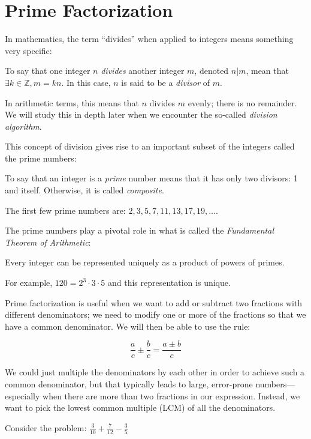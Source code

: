 \documentclass[letterpaper,12pt,fleqn]{article}
\begin{document}
\section*{Prime Factorization}

In mathematics, the term ``divides'' when applied to integers means something
very specific:
\begin{definition}[Divides]
To say that one integer $n$ \emph{divides} another integer $m$, denoted $n|m$,
mean that $\exists k\in\mathbb{Z},m=kn$. In this case, $n$ is said to be a
\emph{divisor} of $m$.
\end{definition}
In arithmetic terms, this means that $n$ divides $m$ evenly; there is no
remainder. We will study this in depth later when we encounter the so-called
\emph{division algorithm}.

This concept of division gives rise to an important subset of the integers
called the prime numbers:
\begin{definition}[Prime]
To say that an integer is a \emph{prime} number means that it has only two
divisors: 1 and itself. Otherwise, it is called \emph{composite}.
\end{definition}
The first few prime numbers are: $2, 3, 5, 7, 11, 13, 17, 19, \ldots$.

The prime numbers play a pivotal role in what is called the \emph{Fundamental
Theorem of Arithmetic}:
\begin{theorem}
Every integer can be represented uniquely as a product of powers of primes.
\end{theorem}
For example, $120=2^3\cdot3\cdot5$ and this representation is unique.

Prime factorization is useful when we want to add or subtract two
fractions with different denominators; we need to modify one or more
of the fractions so that we have a common denominator.  We will then
be able to use the rule:

\[\frac{a}{c}\pm\frac{b}{c}=\frac{a\pm b}{c} \]

We could just multiple the denominators by each other in order to achieve such
a common denominator, but that typically leads to large, error-prone numbers---
especially when there are more than two fractions in our expression. Instead,
we want to pick the lowest common multiple (LCM) of all the denominators.

Consider the problem: $\frac{3}{10}+\frac{7}{12}-\frac{3}{5}$
\end{document}

